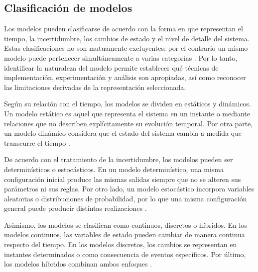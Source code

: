 \subsection{Clasificación de modelos}
\label{subsubsec:clasificacion_modelos}

Los modelos pueden clasificarse de acuerdo con la forma en que representan el tiempo, la incertidumbre, los cambios de estado y el nivel de detalle del sistema. Estas clasificaciones no son mutuamente excluyentes; por el contrario un mismo modelo puede pertenecer simultáneamente a varias categorías \cite{bungartz2014modeling,law2015simulation}. Por lo tanto, identificar la naturaleza del modelo permite establecer qué técnicas de implementación, experimentación y análisis son apropiadas, así como reconocer las limitaciones derivadas de la representación seleccionada. 

Según su relación con el tiempo, los modelos se dividen en estáticos y dinámicos. Un modelo estático es aquel que representa el sistema en un instante o mediante relaciones que no describen explícitamente su evolución temporal. Por otra parte, un modelo dinámico considera que el estado del sistema cambia a medida que transcurre el tiempo \cite{law2015simulation}. 

De acuerdo con el tratamiento de la incertidumbre, los modelos pueden ser determinísticos o estocásticos. En un modelo determinístico, una misma configuración inicial produce las mismas salidas siempre que no se alteren sus parámetros ni sus reglas. Por otro lado, un modelo estocástico incorpora variables aleatorias o distribuciones de probabilidad, por lo que una misma configuración general puede producir distintas realizaciones \cite{bungartz2014modeling,law2015simulation}. 

Asimismo, los modelos se clasifican como continuos, discretos o híbridos. En los modelos continuos, las variables de estado pueden cambiar de manera continua respecto del tiempo. En los modelos discretos, los cambios se representan en instantes determinados o como consecuencia de eventos específicos. Por último, los modelos híbridos combinan ambos enfoques \cite{banks2010discrete,bungartz2014modeling}. 

